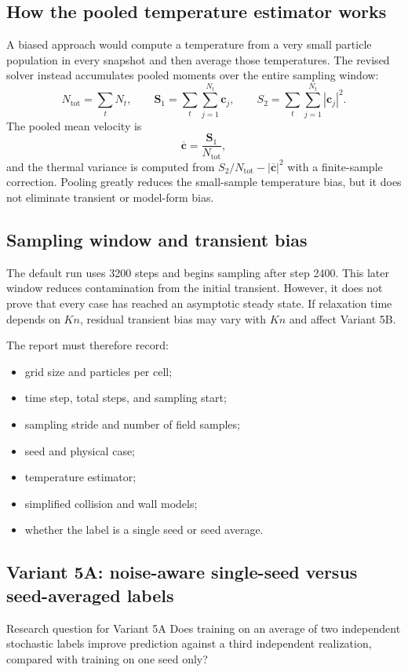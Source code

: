 \documentclass[11pt]{article}
\begin{document}
\subsection{How the pooled temperature estimator works}
A biased approach would compute a temperature from a very small particle population in every snapshot and then average those temperatures. The revised solver instead accumulates pooled moments over the entire sampling window:
\[
N_{\mathrm{tot}}=\sum_t N_t,
\qquad
\mathbf S_1=\sum_t\sum_{j=1}^{N_t}\mathbf c_j,
\qquad
S_2=\sum_t\sum_{j=1}^{N_t}|\mathbf c_j|^2.
\]
The pooled mean velocity is
\[
\overline{\mathbf c}=\frac{\mathbf S_1}{N_{\mathrm{tot}}},
\]
and the thermal variance is computed from $S_2/N_{\mathrm{tot}}-|\overline{\mathbf c}|^2$ with a finite-sample correction. Pooling greatly reduces the small-sample temperature bias, but it does not eliminate transient or model-form bias.

\subsection{Sampling window and transient bias}
The default run uses 3200 steps and begins sampling after step 2400. This later window reduces contamination from the initial transient. However, it does not prove that every case has reached an asymptotic steady state. If relaxation time depends on $Kn$, residual transient bias may vary with $Kn$ and affect Variant 5B.

The report must therefore record:
\begin{itemize}
\item grid size and particles per cell;
\item time step, total steps, and sampling start;
\item sampling stride and number of field samples;
\item seed and physical case;
\item temperature estimator;
\item simplified collision and wall models;
\item whether the label is a single seed or seed average.
\end{itemize}

\subsection{Variant 5A: noise-aware single-seed versus seed-averaged labels}
\begin{projectbox}{Research question for Variant 5A}
Does training on an average of two independent stochastic labels improve prediction against a third independent realization, compared with training on one seed only?
\end{projectbox}
\end{document}

